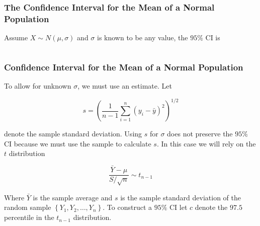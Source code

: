 \documentclass[12pt]{beamer}
\begin{document}
\begin{frame}
\frametitle{The Confidence Interval for the Mean of a Normal Population}
\vspace{2mm}
Assume $X \sim N(\mu, \sigma)$ and $\sigma$ is known to be any value, the 
$95\%$ CI is

\vspace{5mm}
\begin{equation*}
[\bar{y} - 1.96 \sigma / \sqrt{n} \mbox{,} \bar{y} + 1.96 \sigma / \sqrt{n} ]
\end{equation*}
\end{frame}


\begin{frame}[shrink=20]
\frametitle{Confidence Interval for the Mean of a Normal Population}
\vspace{2mm}
To  allow for unknown $\sigma$, we must use an estimate. Let

\vspace{2mm}
\begin{equation*}
s = \left( \frac{1}{n-1} \sum\limits_{i=1}^{n} (y_{i} - \bar{y})^{2} \right)^{1/2}
\end{equation*}

\vspace{2mm}
denote the sample standard deviation. Using $s$ for $\sigma$ does not preserve the $95\%$ CI
because we must use the sample to calculate $s$. In this case we will rely on the $t$ 
distribution

\vspace{2mm}
\begin{equation*}
\frac{\bar{Y} - \mu}{S/\sqrt{n}} \sim t_{n-1}
\end{equation*} 

\vspace{2mm}
Where $\bar{Y}$ is the sample average and $s$ is the sample standard deviation of the random sample
$\left\{ Y_{1}, Y_{2}, \ldots, Y_{n} \right\}$. To construct a $95\%$ CI let $c$ denote the $97.5$
percentile in the $t_{n-1}$ distribution.
\end{frame}
\end{document}
